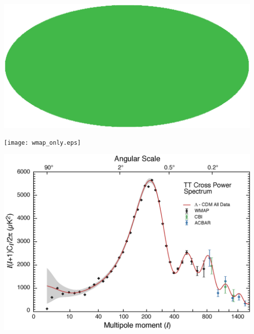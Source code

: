 \documentclass[12pt]{article}
\begin{document}
\pagebreak

\begin{minipage}{\linewidth}
  \vspace{-3 cm}
  \hspace{1 cm} \includegraphics[width=1.6\linewidth, angle=-90]{wmap_flat.eps}
\end{minipage}

\pagebreak

\begin{minipage}{\linewidth}
  \vspace{-3 cm}
  \hspace{1 cm} \texttt{[image: wmap\_only.eps]}
\end{minipage}

\pagebreak

\begin{minipage}{\linewidth}
  \vspace{-1.5 cm}
  \hspace{-0.5 cm} \includegraphics[width=1.35\linewidth, angle=-90]{power_spectrum2.eps}
\end{minipage}
\end{document}
